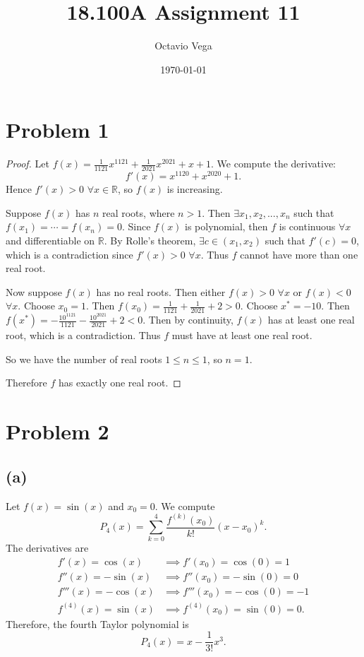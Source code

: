 \documentclass{article}
\title{18.100A Assignment 11}
\author{Octavio Vega}
\date\today
\newcommand{\R}{\mathbb{R}} %
\begin{document}
\maketitle
	
\section*{Problem 1}
\begin{proof}
	Let $f(x) = \frac{1}{1121}x^{1121} + \frac{1}{2021}x^{2021} + x + 1$. We compute the derivative:
	\begin{equation}
		f'(x) = x^{1120} + x^{2020} + 1.
	\end{equation}
	Hence $f'(x) > 0$ $\forall x \in \R$, so $f(x)$ is increasing.
	
	Suppose $f(x)$ has $n$ real roots, where $n > 1$. Then $\exists x_1, x_2, ..., x_n$ such that $f(x_1) = \cdots = f(x_n) = 0$. Since $f(x)$ is polynomial, then $f$ is continuous $\forall x$ and differentiable on $\R$. By Rolle's theorem, $\exists c \in (x_1, x_2)$ such that $f'(c) = 0$, which is a contradiction since $f'(x) > 0$ $\forall x$. Thus $f$ cannot have more than one real root.
	
	Now suppose $f(x)$ has no real roots. Then either $f(x) > 0$ $\forall x$ or $f(x) < 0$ $\forall x$. Choose $x_0 = 1$. Then $f(x_0) = \frac{1}{1121} + \frac{1}{2021} + 2 > 0$. Choose $x^* = -10$. Then $f(x^*) = -\frac{10^{1121}}{1121} - \frac{10^{2021}}{2021} + 2 < 0$.
	Then by continuity, $f(x)$ has at least one real root, which is a contradiction. Thus $f$ must have at least one real root.
	
	So we have the number of real roots $1 \leq n \leq 1$, so $n = 1$.
	
	Therefore $f$ has exactly one real root.
\end{proof}
\section*{Problem 2}
\subsection*{(a)}
Let $f(x) = \sin(x)$ and $x_0 = 0$. We compute
\begin{equation}
	P_4(x) = \sum_{k=0}^4 \frac{f^{(k)}(x_0)}{k!}(x - x_0)^k.
\end{equation}
The derivatives are
\begin{align}
	f'(x) = \cos(x) &\implies f'(x_0) = \cos(0) = 1 \\
	f''(x) = -\sin(x) &\implies f''(x_0) = -\sin(0) = 0 \\
	f'''(x) = -\cos(x) &\implies f'''(x_0) = -\cos(0) = -1 \\
	f^{(4)}(x) = \sin(x) &\implies f^{(4)}(x_0) = \sin(0) = 0.
\end{align}
Therefore, the fourth Taylor polynomial is
\begin{equation}
	P_4(x) = x - \frac{1}{3!}x^3.
\end{equation}
\end{document}
